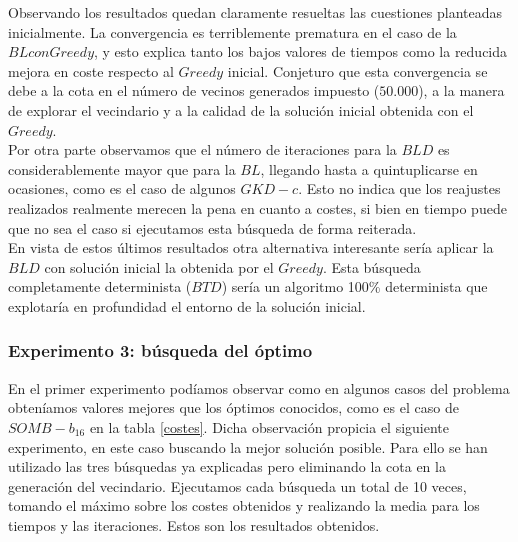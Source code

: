 \documentclass[11pt,a4paper]{article}
\begin{document}
	Observando los resultados quedan claramente resueltas las cuestiones planteadas inicialmente. La convergencia es terriblemente prematura en el caso de la $BL con Greedy$, y esto explica tanto los bajos valores de tiempos como la reducida mejora en coste respecto al $Greedy$ inicial. Conjeturo que esta convergencia se debe a la cota en el número de vecinos generados impuesto ($50.000$), a la manera de explorar el vecindario y a la calidad de la solución inicial obtenida con el $Greedy$. \\
	
	Por otra parte observamos que el número de iteraciones para la $BLD$ es considerablemente mayor que para la $BL$, llegando hasta a quintuplicarse en ocasiones, como es el caso de algunos $GKD-c$. Esto no indica que los reajustes realizados realmente merecen la pena en cuanto a costes, si bien en tiempo puede que no sea el caso si ejecutamos esta búsqueda de forma reiterada. \\
	
	En vista de estos últimos resultados otra alternativa interesante sería aplicar la $BLD$ con solución inicial la obtenida por el $Greedy$. Esta búsqueda completamente determinista ($BTD$) sería un algoritmo 100\% determinista que explotaría en profundidad el entorno de la solución inicial. \\
	
	\subsubsection{ Experimento 3: búsqueda del óptimo } \label{exp13}
	
	En el primer experimento podíamos observar como en algunos casos del problema obteníamos valores mejores que los óptimos conocidos, como es el caso de $SOMB-b_16$ en la tabla \ref{costes}. Dicha observación propicia el siguiente experimento, en este caso buscando la mejor solución posible. Para ello se han utilizado las tres búsquedas ya explicadas pero eliminando la cota en la generación del vecindario. Ejecutamos cada búsqueda un total de 10 veces, tomando el máximo sobre los costes obtenidos y realizando la media para los tiempos y las iteraciones. Estos son los resultados obtenidos. \\
	
\end{document}
